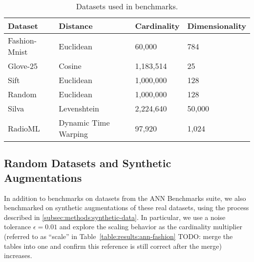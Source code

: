 \begin{table}[!t]
    \caption{Datasets used in benchmarks.}
    \label{table:datasets:summary}
    \vskip 0.15in
    \begin{center}
        \begin{small}
            \begin{sc}
                \begin{tabular}{|l|l|l|l|}
                    \hline
                    \textbf{Dataset} & \textbf{Distance}  &\textbf{Cardinality}  & \textbf{Dimensionality}  \\
                    \hline
                    Fashion-Mnist    & Euclidean              & 60,000             & 784       \\
                    \hline
                    Glove-25         & Cosine                 & 1,183,514          & 25        \\
                    \hline
                    Sift             & Euclidean              & 1,000,000          & 128       \\
                    \hline
                    Random           & Euclidean              & 1,000,000          & 128       \\
                    \hline
                    Silva            & Levenshtein            & 2,224,640          & 50,000         \\
                    \hline
                    RadioML          & Dynamic Time Warping   & 97,920             & 1,024     \\
                    \hline
                \end{tabular}
            \end{sc}
        \end{small}
    \end{center}
    \vskip -0.1in
\end{table}

\subsection{Random Datasets and Synthetic Augmentations}
\label{subsec:random-datasets}

In addition to benchmarks on datasets from the ANN Benchmarks suite, we also benchmarked on synthetic augmentations of these real datasets, using the process described in \ref{subsec:methods:synthetic-data}. 
In particular, we use a noise tolerance $\epsilon = 0.01$ and explore the scaling behavior as the cardinality multiplier (referred to as ``scale'' in Table~\ref{table:results:ann-fashion} {\color{red} TODO: merge the tables into one and confirm this reference is still correct after the merge}) increases. 

